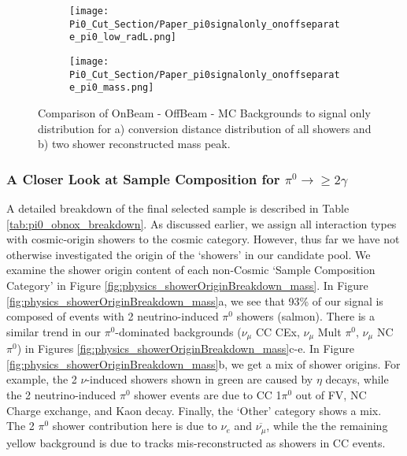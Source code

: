 \begin{figure}[h!]
\centering
  \begin{subfigure}[t]{0.3\textwidth}
    \centering
\texttt{[image: Pi0\_Cut\_Section/Paper\_pi0signalonly\_onoffseparate\_pi0\_low\_radL.png]}
  \caption{ }
  \end{subfigure} 
  \hspace{30mm}
  \begin{subfigure}[t]{0.3\textwidth}
    \centering
\texttt{[image: Pi0\_Cut\_Section/Paper\_pi0signalonly\_onoffseparate\_pi0\_mass.png]}
  \caption{ }
  \end{subfigure} 

\caption{ Comparison of OnBeam - OffBeam - MC Backgrounds to signal only distribution for a) conversion distance distribution of all showers and b) two shower reconstructed mass peak.  }
\label{fig:physics_pi0signalonly_mass} 
\end{figure}


\clearpage
\subsubsection{A Closer Look at Sample Composition for $\pi^0\rightarrow\geq 2 \gamma$}
A detailed breakdown of the final selected sample is described in Table \ref{tab:pi0_obnox_breakdown}.  As discussed earlier, we assign all interaction types with cosmic-origin showers to the cosmic category.  However, thus far we have not otherwise investigated the origin of the `showers' in our candidate pool.  We examine the shower origin content of each non-Cosmic `Sample Composition Category' in Figure \ref{fig:physics_showerOriginBreakdown_mass}.  In Figure \ref{fig:physics_showerOriginBreakdown_mass}a, we see that 93\% of our signal is composed of events with 2 neutrino-induced $\pi^0$ showers (salmon). There is a similar trend in our $\pi^0$-dominated backgrounds ($\nu_\mu$ CC CEx, $\nu_\mu$ Mult $\pi^0$, $\nu_\mu$ NC $\pi^0$) in Figures \ref{fig:physics_showerOriginBreakdown_mass}c-e.  In Figure \ref{fig:physics_showerOriginBreakdown_mass}b, we get a mix of shower origins. For example, the 2 $\nu$-induced showers shown in green are caused by $\eta$ decays, while the 2 neutrino-induced $\pi^0$ shower events are due to CC 1$\pi^0$ out of FV, NC Charge exchange, and Kaon decay. Finally, the `Other' category shows a mix.  The 2 $\pi^0$ shower contribution here is due to $\nu_e$ and $\overline{\nu_\mu}$, while the the remaining yellow background is due to tracks mis-reconstructed as showers in CC events.


